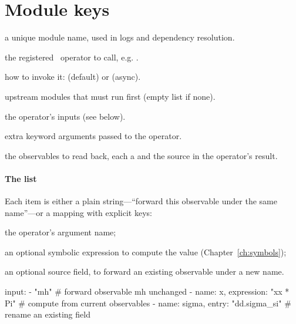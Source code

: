 \section{Module keys}
\label{sec:op-keys}

\begin{description}[style=nextline, leftmargin=1.2em]
  \item[\yamlkey{name}] a unique module name, used in logs and dependency resolution.
  \item[\yamlkey{operator}] the registered \Operas\ operator to call, e.g.
        .
  \item[\yamlkey{call\_mode}] how to invoke it:  (default) or  (async).
  \item[\yamlkey{required\_modules}] upstream modules that must run first (empty list if none).
  \item[\yamlkey{input}] the operator's inputs (see below).
  \item[\yamlkey{kwargs}] extra keyword arguments passed to the operator.
  \item[\yamlkey{output}] the observables to read back, each a  and the source
         in the operator's result.
\end{description}

\paragraph{The  list} Each item is either a plain string---``forward this
observable under the same name''---or a mapping with explicit keys:

\begin{description}[style=nextline, leftmargin=1.2em]
  \item[\yamlkey{name}] the operator's argument name;
  \item[\yamlkey{expression}] an optional symbolic expression to compute the value
        (Chapter~\ref{ch:symbols});
  \item[\yamlkey{entry}] an optional source field, to forward an existing observable under a new
        name.
\end{description}

\begin{yamlwin}
input:
  - "mh"                                   # forward observable mh unchanged
  - {name: x, expression: "xx * Pi"}       # compute from current observables
  - {name: sigma, entry: "dd.sigma_si"}    # rename an existing field
\end{yamlwin}

